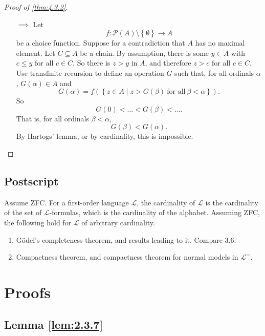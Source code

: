 \documentclass{article}
\renewcommand{\L}{\mathcal{L}}
\newcommand{\rb}[1]{\left( #1 \right)}
\newcommand{\cb}[1]{\left\{ #1 \right\}}
\theoremstyle{definition}\newtheorem{definition}{Definition}[subsection]
\theoremstyle{definition}\newtheorem{remark1}[definition]{Remark}
\theoremstyle{definition}\newtheorem{example1}[definition]{Example}
\theoremstyle{definition}\newtheorem*{remark2}{Remark}
\theoremstyle{definition}\newtheorem*{example2}{Example}
\theoremstyle{definition}\newtheorem*{note}{Note}
\theoremstyle{definition}\newtheorem*{notation}{Notation}
\begin{document}
\begin{proof}[Proof of \ref{thm:4.3.2}]
\hfill
\begin{itemize}
\item[$ \implies $] Let
$$ f : \mathcal{P} \rb{A} \setminus \cb{\emptyset} \to A $$
be a choice function. Suppose for a contradiction that $ A $ has no maximal element. Let $ C \subseteq A $ be a chain. By assumption, there is some $ y \in A $ with $ c \le y $ for all $ c \in C $. So there is $ z > y $ in $ A $, and therefore $ z > c $ for all $ c \in C $. Use transfinite recursion to define an operation $ G $ such that, for all ordinals $ \alpha $, $ G\rb{\alpha} \in A $ and
$$ G\rb{\alpha} = f\rb{\cb{z \in A \mid z > G\rb{\beta} \ \text{for all} \ \beta < \alpha}}. $$
So
$$ G\rb{0} < \dots < G\rb{\beta} < \dots. $$
That is, for all ordinals $ \beta < \alpha $,
$$ G\rb{\beta} < G\rb{\alpha}. $$
By Hartogs' lemma, or by cardinality, this is impossible.
\end{itemize}
\end{proof}

\pagebreak

\subsection{Postscript}

Assume ZFC. For a first-order language $ \L $, the cardinality of $ \L $ is the cardinality of the set of $ \L $-formulas, which is the cardinality of the alphabet. Assuming ZFC, the following hold for $ \L $ of arbitrary cardinality.
\begin{enumerate}
\item G\"odel's completeness theorem, and results leading to it. Compare 3.6.
\item Compactness theorem, and compactness theorem for normal models in $ \L^= $.
\end{enumerate}

\pagebreak

\appendix

\section{Proofs}

\subsection{Lemma \ref{lem:2.3.7}}
\end{document}

